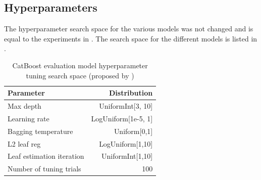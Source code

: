 \subsection{Hyperparameters}
The hyperparameter search space for the various models was not changed and is equal to the experiments in \cite{kotelnikov2022TabDDPMModellingTabular}.
The search space for the different models is listed in . 
\begin{table}[h]
	\centering
	\begin{tabular}{lr}
		\toprule
		Parameter                 & Distribution        \\
		\midrule
		Max depth                 & UniformInt[3, 10]   \\
		Learning rate             & LogUniform[1e-5, 1] \\
		Bagging temperature       & Uniform[0,1]        \\
		L2 leaf reg               & LogUniform[1,10]    \\
		Leaf estimation iteration & UniformInt[1,10]    \\
		\midrule
		Number of tuning trials   & 100                 \\
		\bottomrule
	\end{tabular}
	\caption[CatBoost Hyperparameter Search Space]{CatBoost evaluation model hyperparameter tuning search space (proposed by \cite{gorishniy2021RevisitingDeepLearning})}
	\label{tab:catboost_tune}
\end{table}

